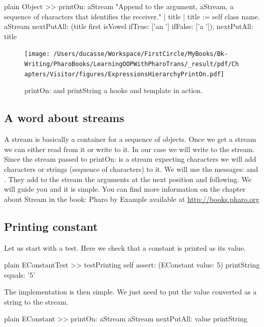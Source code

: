 \documentclass[10pt,twoside,english]{_support/latex/sbabook/sbabook}
\begin{document}
\begin{displaycode}{plain}
Object >> printOn: aStream
	"Append to the argument, aStream, a sequence of characters that  
	identifies the receiver."
	| title |
	title := self class name.
	aStream
		nextPutAll: (title first isVowel ifTrue: ['an '] ifFalse: ['a ']);
		nextPutAll: title
\end{displaycode}


\begin{figure}

\begin{center}
\texttt{[image: /Users/ducasse/Workspace/FirstCircle/MyBooks/Bk-Writing/PharoBooks/LearningOOPWithPharoTrans/\_result/pdf/Chapters/Visitor/figures/ExpressionsHierarchyPrintOn.pdf]}\caption{printOn: and printString a hooks and template in action.\label{fig:ExpressionsHierarchyPrintOn}}\end{center}
\end{figure}

\subsection{A word about streams}
A stream is basically a container for a sequence of objects. Once we get a stream we can either read from it or write to it. In our case we will write to the stream. Since the stream passed to printOn: is a stream expecting characters we will add characters or strings (sequence of characters) to it. We will use the messages:  and . 
They add to the stream the arguments at the next position and following. We will guide you and it is simple. 
You can find more information on the chapter about Stream in the book: Pharo by Example available at \url{http://books.pharo.org}
\subsection{Printing constant}
Let us start with a test. Here we check that a constant is printed as its value.

\begin{displaycode}{plain}
EConstantTest >> testPrinting
	self assert: (EConstant value: 5) printString equals: '5'
\end{displaycode}

The implementation is then simple. We just need to put the value converted as a string to the stream.
 

\begin{displaycode}{plain}
EConstant >> printOn: aStream
	aStream nextPutAll: value printString
\end{displaycode}
\end{document}
